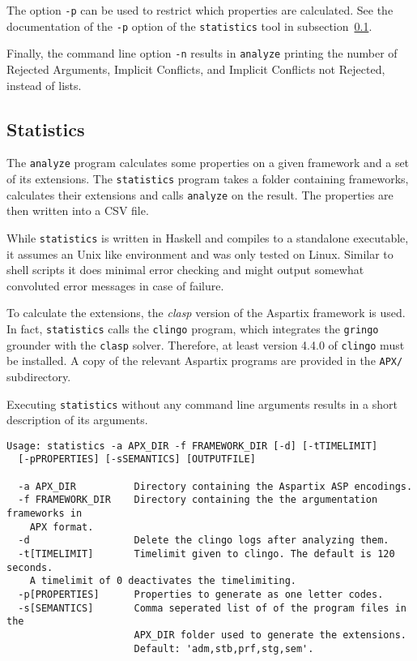 \documentclass[parskip=half]{scrartcl}
\begin{document}
The option \texttt{-p} can be used to restrict which properties are calculated.
See the documentation of the \texttt{-p} option of the \texttt{statistics} tool
in subsection~\ref{statistics}.

Finally, the command line option \texttt{-n} results in \texttt{analyze}
printing the number of Rejected Arguments, Implicit Conflicts, and Implicit
Conflicts not Rejected, instead of lists.

\subsection{Statistics}
\label{statistics}

The \texttt{analyze} program calculates some properties on a given framework and
a set of its extensions. The \texttt{statistics} program takes a folder
containing frameworks, calculates their extensions and calls \texttt{analyze} on
the result. The properties are then written into a CSV file.

While \texttt{statistics} is written in Haskell and compiles to a standalone
executable, it assumes an Unix like environment and was only tested on Linux.
Similar to shell scripts it does minimal error checking and might output
somewhat convoluted error messages in case of failure.

To calculate the extensions, the \emph{clasp} version of the Aspartix framework
is used.  In fact, \texttt{statistics} calls the \texttt{clingo} program, which
integrates the \texttt{gringo} grounder with the \texttt{clasp} solver.
Therefore, at least version 4.4.0 of \texttt{clingo} must be installed.  A copy of the
relevant Aspartix programs are provided in the \texttt{APX/} subdirectory.

Executing \texttt{statistics} without any command line arguments results in a short
description of its arguments.
\begin{verbatim}
Usage: statistics -a APX_DIR -f FRAMEWORK_DIR [-d] [-tTIMELIMIT]
  [-pPROPERTIES] [-sSEMANTICS] [OUTPUTFILE]

  -a APX_DIR          Directory containing the Aspartix ASP encodings.
  -f FRAMEWORK_DIR    Directory containing the the argumentation frameworks in
    APX format.
  -d                  Delete the clingo logs after analyzing them.
  -t[TIMELIMIT]       Timelimit given to clingo. The default is 120 seconds.
    A timelimit of 0 deactivates the timelimiting.
  -p[PROPERTIES]      Properties to generate as one letter codes.
  -s[SEMANTICS]       Comma seperated list of of the program files in the
                      APX_DIR folder used to generate the extensions.
                      Default: 'adm,stb,prf,stg,sem'.
\end{verbatim}
\end{document}
